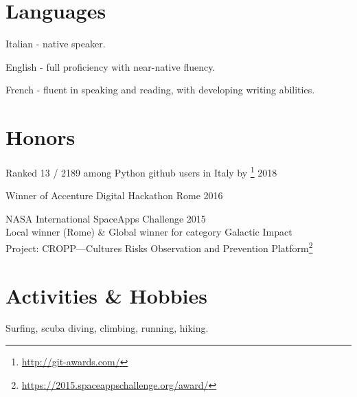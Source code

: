 \documentclass[margin]{res}
\begin{document}
\begin{resume}
        \section{Languages}
        \begin{description}
            \item Italian - native speaker.
            \item English - full proficiency with near-native fluency.
            \item French - fluent in speaking and reading, with developing writing abilities.
        \end{description}

        \section{Honors}
        \begin{description}
            \item Ranked 13 / 2189 among Python github users in Italy by \footnote{\url{http://git-awards.com/}} \hfill 2018
            \item Winner of Accenture Digital Hackathon Rome \hfill 2016
            \item NASA International SpaceApps Challenge \hfill 2015\\
                Local winner (Rome) \& Global winner for category Galactic Impact\\
                Project: CROPP---Cultures Risks Observation and Prevention
                Platform\footnote{\url{https://2015.spaceappschallenge.org/award/}}
        \end{description}

        \section{Activities \& Hobbies}
        \begin{description}
        	\item Surfing, scuba diving, climbing, running, hiking.
        \end{description}
    \end{resume}
\end{document}
